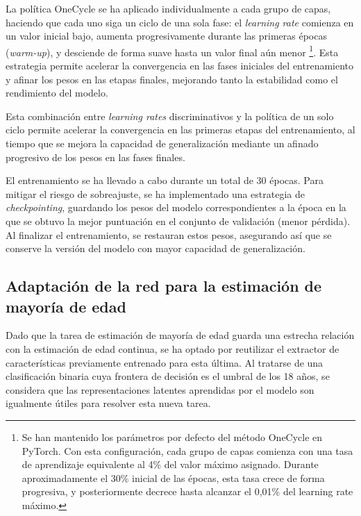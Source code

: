 La política OneCycle se ha aplicado individualmente a cada grupo de capas, haciendo que cada uno siga un 
ciclo de una sola fase:
el \textit{learning rate} comienza en un valor inicial bajo, aumenta progresivamente durante las primeras 
épocas (\textit{warm-up}), y desciende de forma suave hasta un valor final aún menor
\footnote{
    Se han mantenido los parámetros por defecto del método OneCycle en PyTorch. Con esta configuración, cada 
    grupo de capas comienza con una tasa de aprendizaje equivalente al 4\% del valor máximo asignado. Durante 
    aproximadamente el 30\% inicial de las épocas, esta tasa crece de forma progresiva, y posteriormente 
    decrece hasta alcanzar el 0,01\% del learning rate máximo.
}. 
Esta estrategia permite acelerar la convergencia en las fases iniciales del entrenamiento y afinar los pesos 
en las etapas finales, mejorando tanto la estabilidad como el rendimiento del modelo.

Esta combinación entre \textit{learning rates} discriminativos y la política de un solo ciclo permite 
acelerar la convergencia en las primeras etapas del entrenamiento, al tiempo que se mejora la capacidad de 
generalización mediante un afinado progresivo de los pesos en las fases finales.

El entrenamiento se ha llevado a cabo durante un total de 30 épocas. Para mitigar el riesgo de sobreajuste,
se ha implementado una estrategia de \textit{checkpointing}, guardando los pesos del modelo correspondientes 
a la época en la que se obtuvo la mejor puntuación en el conjunto de validación (menor pérdida).
Al finalizar el entrenamiento, se restauran estos pesos, asegurando así que se conserve la versión del modelo 
con mayor capacidad de generalización.



\subsection{Adaptación de la red para la estimación de mayoría de edad}

Dado que la tarea de estimación de mayoría de edad guarda una estrecha relación con la estimación de edad 
continua, se ha optado por reutilizar el extractor de características previamente entrenado para esta última. 
Al tratarse de una clasificación binaria cuya frontera de decisión es el umbral de los 18 años, se considera 
que las representaciones latentes aprendidas por el modelo son igualmente útiles para resolver esta nueva 
tarea.

